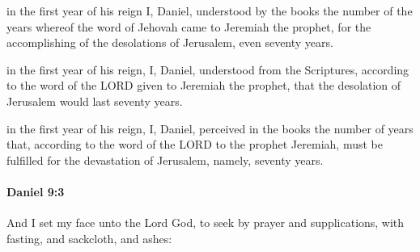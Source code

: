 			\begin{versebox}
					\item[BHS] 
					\item[LXX] 
					\item[ASV] in the first year of his reign I, Daniel, understood by the books the number of the years whereof the word of Jehovah came to Jeremiah the prophet, for the accomplishing of the desolations of Jerusalem, even seventy years.
					\item[NIV] in the first year of his reign, I, Daniel, understood from the Scriptures, according to the word of the LORD given to Jeremiah the prophet, that the desolation of Jerusalem would last seventy years.
					\item[NRSV] in the first year of his reign, I, Daniel, perceived in the books the number of years that, according to the word of the LORD to the prophet Jeremiah, must be fulfilled for the devastation of Jerusalem, namely, seventy years.
			\end{versebox}

		\paragraph{Daniel 9:3} %
			\label{DANIEL-9-3}

			And I set my face unto the Lord God, to seek by prayer and supplications, with fasting, and sackcloth, and ashes:

